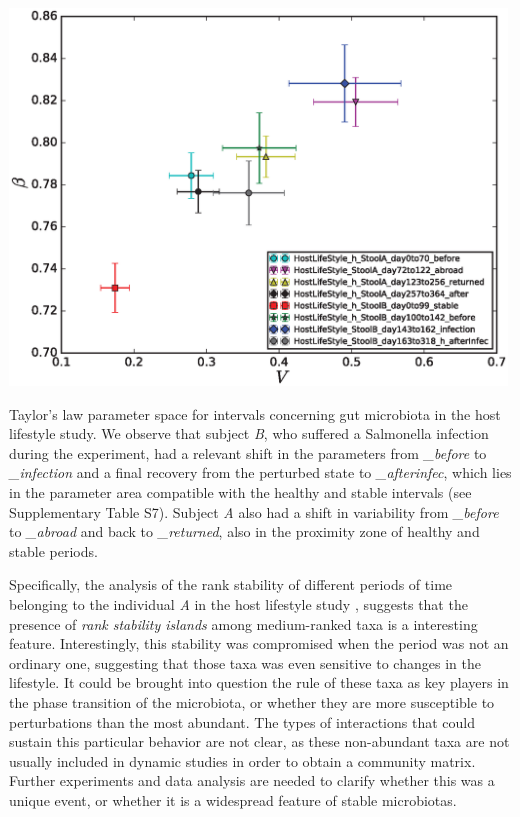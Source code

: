 \begin{supfig}
	\centering
	\includegraphics[width=0.99\textwidth]{figs/supfig_HLS_xWSummary.eps}
	\caption{Taylor's law parameter space for intervals concerning gut microbiota in the host lifestyle study\cite{hostlife}. We observe that subject \emph{B}, who suffered a Salmonella infection during the experiment, had a relevant shift in the parameters from \emph{\_before} to \emph{\_infection} and a final recovery from the perturbed state to \emph{\_afterinfec}, which lies in the parameter area compatible with the healthy and stable intervals (see Supplementary Table S7). Subject \emph{A} also had a shift in variability from \emph{\_before} to \emph{\_abroad} and back to \emph{\_returned}, also in the proximity zone of healthy and stable periods.}
	\label{supfig:HLS_xWSummary}
\end{supfig}
 
Specifically, the analysis of the rank stability of different periods of time belonging to the individual \emph{A} in the host lifestyle study \cite{hostlife}, suggests that the presence of \emph{rank stability islands} among medium-ranked taxa is a interesting feature. Interestingly, this stability was compromised when the period was not an ordinary one, suggesting that those taxa was even sensitive to changes in the lifestyle. It could be brought into question the rule of these taxa as key players in the phase transition of the microbiota, or whether they are more susceptible to perturbations than the most abundant. The types of interactions that could sustain this particular behavior are not clear, as these non-abundant taxa are not usually included in dynamic studies in order to obtain a community matrix. Further experiments and data analysis are needed to clarify whether this was a unique event, or whether it is a widespread feature of stable microbiotas. 

